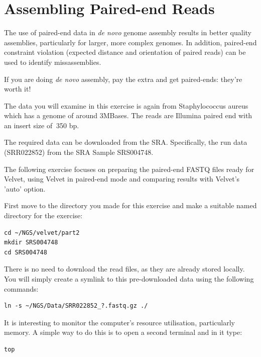 \section{Assembling Paired-end Reads}

The use of paired-end data in \textit{de novo} genome assembly results in better
quality assemblies, particularly for larger, more complex genomes. In addition,
paired-end constraint violation (expected distance and orientation of paired
reads) can be used to identify missassemblies.

\begin{warning}
If you are doing \textit{de novo} assembly, pay the extra and get paired-ends:
they're worth it!
\end{warning}

\begin{note}
The data you will examine in this exercise is again from Staphylococcus aureus
which has a genome of around 3MBases. The reads are Illumina paired end with an
insert size of $~$350 bp.

The required data can be downloaded from the SRA. Specifically, the run data
(SRR022852) from the SRA Sample SRS004748.


\end{note}

\begin{information}
The following exercise focuses on preparing the paired-end FASTQ files ready for
Velvet, using Velvet in paired-end mode and comparing results with Velvet's
'auto' option.
\end{information}

\begin{steps}
First move to the directory you made for this exercise and make a suitable named
directory for the exercise:
\begin{lstlisting}
cd ~/NGS/velvet/part2 
mkdir SRS004748 
cd SRS004748
\end{lstlisting}

There is no need to download the read files, as they are already stored
locally. You will simply create a symlink to this pre-downloaded data using
the following commands:
\begin{lstlisting}
ln -s ~/NGS/Data/SRR022852_?.fastq.gz ./
\end{lstlisting}

It is interesting to monitor the computer's resource utilisation, particularly
memory. A simple way to do this is to open a second terminal and in it type:
\begin{lstlisting}
top
\end{lstlisting}
\end{steps}

